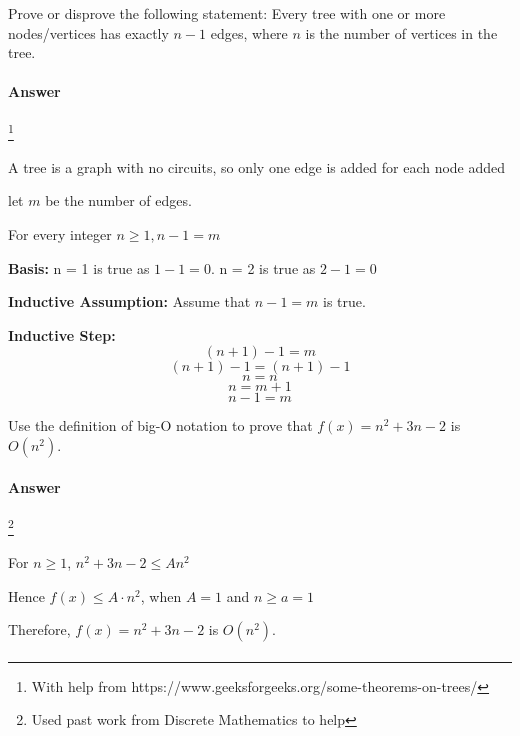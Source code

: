 \documentclass{article}
\begin{document}
\collab{}

Prove or disprove the following statement: Every tree with one or more
nodes/vertices has exactly $n-1$ edges, where $n$ is the number of vertices in
the tree.

\paragraph{Answer}
\footnote{With help from https://www.geeksforgeeks.org/some-theorems-on-trees/}

A tree is a graph with no circuits, so only one edge is added for each node added

let $m$ be the number of edges.

For every integer $n \geq 1, n - 1 = m$

{\bf Basis:} n = 1 is true as $1 - 1 = 0$. n = 2 is true as $2-1=0$

{\bf Inductive Assumption:} Assume that $n - 1 = m$ is true.

      {\bf Inductive Step:} $$(n+1) -1 = m $$
$$(n+1) -1 = (n +1) - 1$$
$$n=n$$
$$n=m +1$$
$$n-1=m$$



\collab{}

Use the definition of big-O notation to prove that $f(x)=n^2 + 3n -2$ is
$O(n^2)$.

\paragraph{Answer}
\footnote{Used past work from Discrete Mathematics to help}

For $n \ge 1$, $ n^2 + 3n -2 \leq A n^2$

Hence $f(x) \leq A \cdot n^2$, when $A = 1$ and $n \geq a = 1$

Therefore, $f(x)=n^2 + 3n -2$ is $O(n^2)$.

\paragraph{}
\end{document}
